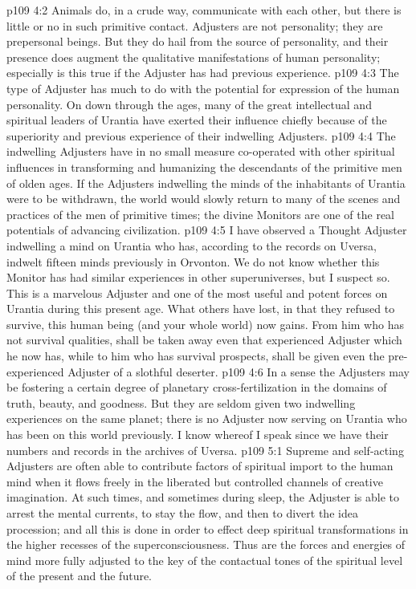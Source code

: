 \vs p109 4:2 Animals do, in a crude way, communicate with each other, but there is little or no  in such primitive contact. Adjusters are not personality; they are prepersonal beings. But they do hail from the source of personality, and their presence does augment the qualitative manifestations of human personality; especially is this true if the Adjuster has had previous experience.
\vs p109 4:3 The type of Adjuster has much to do with the potential for expression of the human personality. On down through the ages, many of the great intellectual and spiritual leaders of Urantia have exerted their influence chiefly because of the superiority and previous experience of their indwelling Adjusters.
\vs p109 4:4 The indwelling Adjusters have in no small measure co\hyp{}operated with other spiritual influences in transforming and humanizing the descendants of the primitive men of olden ages. If the Adjusters indwelling the minds of the inhabitants of Urantia were to be withdrawn, the world would slowly return to many of the scenes and practices of the men of primitive times; the divine Monitors are one of the real potentials of advancing civilization.
\vs p109 4:5 \pc I have observed a Thought Adjuster indwelling a mind on Urantia who has, according to the records on Uversa, indwelt fifteen minds previously in Orvonton. We do not know whether this Monitor has had similar experiences in other superuniverses, but I suspect so. This is a marvelous Adjuster and one of the most useful and potent forces on Urantia during this present age. What others have lost, in that they refused to survive, this human being (and your whole world) now gains. From him who has not survival qualities, shall be taken away even that experienced Adjuster which he now has, while to him who has survival prospects, shall be given even the pre\hyp{}experienced Adjuster of a slothful deserter.
\vs p109 4:6 In a sense the Adjusters may be fostering a certain degree of planetary cross\hyp{}fertilization in the domains of truth, beauty, and goodness. But they are seldom given two indwelling experiences on the same planet; there is no Adjuster now serving on Urantia who has been on this world previously. I know whereof I speak since we have their numbers and records in the archives of Uversa.
\vs p109 5:1 Supreme and self\hyp{}acting Adjusters are often able to contribute factors of spiritual import to the human mind when it flows freely in the liberated but controlled channels of creative imagination. At such times, and sometimes during sleep, the Adjuster is able to arrest the mental currents, to stay the flow, and then to divert the idea procession; and all this is done in order to effect deep spiritual transformations in the higher recesses of the superconsciousness. Thus are the forces and energies of mind more fully adjusted to the key of the contactual tones of the spiritual level of the present and the future.
